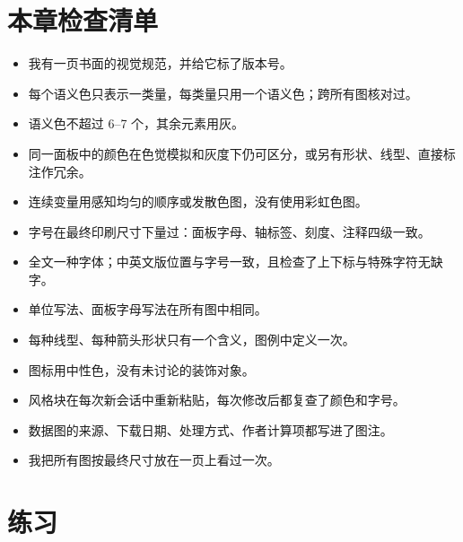\section{本章检查清单}

\begin{itemize}
\item 我有一页书面的视觉规范，并给它标了版本号。
\item 每个语义色只表示一类量，每类量只用一个语义色；跨所有图核对过。
\item 语义色不超过 6–7 个，其余元素用灰。
\item 同一面板中的颜色在色觉模拟和灰度下仍可区分，或另有形状、线型、直接标注作冗余。
\item 连续变量用感知均匀的顺序或发散色图，没有使用彩虹色图。
\item 字号在最终印刷尺寸下量过：面板字母、轴标签、刻度、注释四级一致。
\item 全文一种字体；中英文版位置与字号一致，且检查了上下标与特殊字符无缺字。
\item 单位写法、面板字母写法在所有图中相同。
\item 每种线型、每种箭头形状只有一个含义，图例中定义一次。
\item 图标用中性色，没有未讨论的装饰对象。
\item 风格块在每次新会话中重新粘贴，每次修改后都复查了颜色和字号。
\item 数据图的来源、下载日期、处理方式、作者计算项都写进了图注。
\item 我把所有图按最终尺寸放在一页上看过一次。
\end{itemize}

\section{练习}

